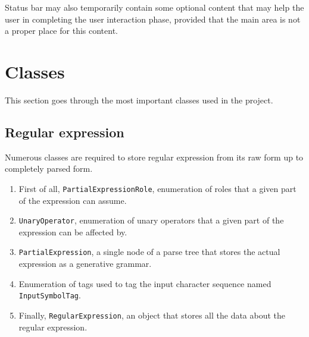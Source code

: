 \documentclass{article}
\begin{document}
Status bar may also temporarily contain some optional content that may help the user in completing
the user interaction phase, provided that the main area is not a proper place for this content.

\section{Classes}
This section goes through the most important classes used in the project.

\subsection{Regular expression}
Numerous classes are required to store regular expression from its raw form up to completely parsed
form.

\begin{enumerate}

  \item First of all, \verb|PartialExpressionRole|, enumeration of roles that a given part of the
  expression can assume.

  \item \verb|UnaryOperator|, enumeration of unary operators that a given part of the expression can
  be affected by.

  \item \verb|PartialExpression|, a single node of a parse tree that stores the actual
  expression as a generative grammar.

  \item Enumeration of tags used to tag the input character sequence named \verb|InputSymbolTag|.

  \item Finally, \verb|RegularExpression|, an object that stores all the data about the regular expression.

\end{enumerate}

% 

\end{document}
